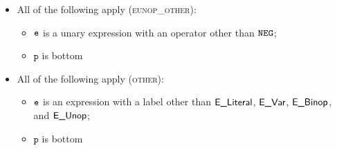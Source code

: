 \documentclass{book}
\newcommand\vp[0]{\texttt{p}}
\begin{document}
\begin{itemize}
  \item All of the following apply (\textsc{eunop\_other}):
  \begin{itemize}
    \item $\texttt{e}$ is a unary expression with an operator other than $\texttt{NEG}$;
    \item $\vp$ is bottom
  \end{itemize}

  \item All of the following apply (\textsc{other}):
  \begin{itemize}
    \item $\texttt{e}$ is an expression with a label other than $\textsf{E\_Literal}$, $\textsf{E\_Var}$, $\textsf{E\_Binop}$, and $\textsf{E\_Unop}$;
    \item $\vp$ is bottom
  \end{itemize}
\end{itemize}
\end{document}
